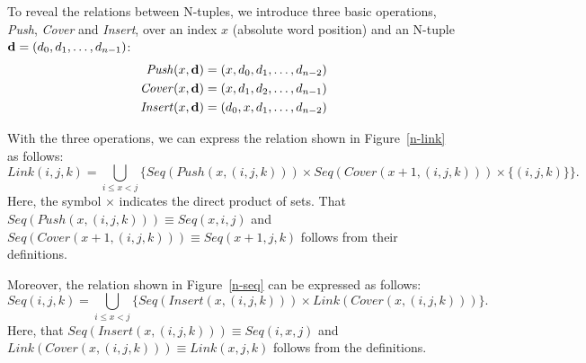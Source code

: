 \documentclass[english]{jnlp_1.4}
\begin{document}
To reveal the relations between N-tuples, 
we introduce three basic operations, {\em Push}, {\em Cover} and {\em Insert}, over an index $x$ (absolute word position) and an N-tuple ${\bf{d}} = (d_0, d_1, \dots, d_{n-1})$:
\begin{align}
\mathit{Push} (x, {\bf{d}}) &= (x, d_0, d_1, \dots, d_{n-2}) \label{push} \\
\mathit{Cover} (x, {\bf{d}}) &= (x, d_1, d_2, \dots, d_{n-1}) \label{cover} \\
\mathit{Insert} (x, {\bf{d}}) &= (d_0, x, d_1, \dots, d_{n-2}) \label{insert}
\end{align} 

With the three operations, we can express the relation shown in Figure~\ref{n-link} as follows:
\begin{equation}
\label{linkexample}
\mathit{Link} (i, j, k) = \bigcup_{i \le x < j}\{\mathit{Seq} (\mathit{Push} (x, (i, j, k))) \times \mathit{Seq} (\mathit{Cover} (x+1, (i, j, k))) \times \{ { (i, j, k)\} } \}.
\end{equation}
Here, the symbol $\times$ indicates the direct product of sets. That $\mathit{Seq} (\mathit{Push} (x, (i, j, k))) \equiv \mathit{Seq} (x, i, j)$ and $\mathit{Seq} (\mathit{Cover} (x+1, (i, j, k))) \equiv \mathit{Seq} (x+1, j, k)$ follows from their definitions.

Moreover, the relation shown in Figure~\ref{n-seq} can be expressed as follows:
\begin{equation}
\label{seqexample}
\mathit{Seq} (i, j, k) = \bigcup_{i \le x < j}\{\mathit{Seq} (\mathit{Insert} (x, (i, j, k))) 
	\times \mathit{Link} (\mathit{Cover} (x, (i, j, k))) \}.
\end{equation}
Here, that $\mathit{Seq} (\mathit{Insert} (x, (i, j, k))) \equiv \mathit{Seq} (i, x, j)$ and $\mathit{Link} (\mathit{Cover} (x, (i, j, k))) \equiv \mathit{Link} (x, j, k)$ follows from the definitions.
\end{document}
